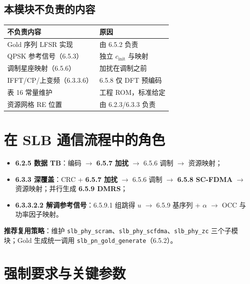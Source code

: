 \documentclass[11pt,a4paper]{ctexart}
\begin{document}
\subsection{本模块不负责的内容}

\begin{table}[h]
\centering
\small
\begin{tabular}{p{5.5cm}p{8.5cm}}
\toprule
\textbf{不负责内容} & \textbf{原因} \\
\midrule
Gold 序列 LFSR 实现 & 由 6.5.2 负责 \\
QPSK 参考信号（6.5.3） & 独立 $c_{\mathrm{init}}$ 与映射 \\
调制星座映射（6.5.6） & 加扰在调制之前 \\
IFFT/CP/上变频（6.3.3.6） & 6.5.8 仅 DFT 预编码 \\
表 16 常量维护 & 工程 ROM，标准给定 \\
资源网格 RE 位置 & 由 6.2.3/6.3.3 负责 \\
\bottomrule
\end{tabular}
\end{table}

\section{在 SLB 通信流程中的角色}

\begin{itemize}
  \item \textbf{6.2.5 数据 TB}：编码 $\rightarrow$ \textbf{6.5.7 加扰} $\rightarrow$ 6.5.6 调制 $\rightarrow$ 资源映射；
  \item \textbf{6.3.3 深覆盖}：CRC + \textbf{6.5.7 加扰} $\rightarrow$ 6.5.6 调制 $\rightarrow$ \textbf{6.5.8 SC-FDMA} $\rightarrow$ 资源映射；并行生成 \textbf{6.5.9 DMRS}；
  \item \textbf{6.3.3.2.2 解调参考信号}：6.5.9.1 组跳得 $u$ $\rightarrow$ 6.5.9 基序列 + $\alpha$ $\rightarrow$ OCC 与功率因子映射。
\end{itemize}

\textbf{推荐复用策略}：维护 \texttt{slb\_phy\_scram}、\texttt{slb\_phy\_scfdma}、\texttt{slb\_phy\_zc} 三个子模块；Gold 生成统一调用 \texttt{slb\_pn\_gold\_generate}（6.5.2）。

\section{强制要求与关键参数}
\end{document}

